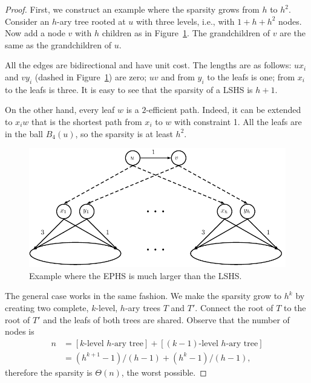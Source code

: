 \begin{proof}
First, we construct an example where the sparsity grows from $h$ to $h^2$.
Consider an $h$-ary tree rooted at $u$ with three levels, i.e., with $1+h+h^2$ nodes.
Now add a node $v$ with $h$ children as in Figure~\ref{fig:treelike}. 
The grandchildren of $v$ are the same as the grandchildren of $u$.

All the edges are bidirectional and have unit cost.
The lengths are as follows: $ux_i$ and $vy_i$ (dashed in Figure~\ref{fig:treelike}) are zero; $uv$ and from $y_i$ to the leafs is one; from $x_i$ to the leafs is three.
It is easy to see that the sparsity of a LSHS is $h+1$.

On the other hand, every leaf $w$ is a $2$-efficient path.
Indeed, it can be extended to $x_iw$ that is the shortest path from $x_i$ to $w$ with constraint 1.
All the leafs are in the ball $B_4(u)$, so the sparsity is at least $h^2$.

\begin{figure}
\centering
\includegraphics[scale=0.5]{TexImg/Treelike.pdf}
\caption{Example where the EPHS is much larger than the LSHS.}\label{fig:treelike}
\end{figure}

The general case works in the same fashion.
We make the sparsity grow to $h^k$ by creating two complete, $k$-level, $h$-ary trees $T$ and $T'$.
Connect the root of $T$ to the root of $T'$ and the leafs of both trees are shared.
Observe that the number of nodes is 
\begin{align*}
n &=[\text{$k$-level $h$-ary tree}] + [\text{$(k-1)$-level $h$-ary tree}]\\
&= ({h^{k+1}-1})/({h-1}) + ({h^k-1})/({h-1}),
\end{align*}
therefore the sparsity is $\Theta(n)$, the worst possible.
\end{proof}
